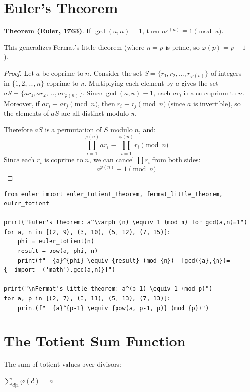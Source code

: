\section{Euler's Theorem}

\textbf{Theorem (Euler, 1763).} If $\gcd(a,n) = 1$, then $a^{\varphi(n)} \equiv 1 \pmod{n}$.

This generalizes Fermat's little theorem (where $n=p$ is prime, so $\varphi(p) = p-1$).

\begin{proof}
Let $a$ be coprime to $n$. Consider the set $S = \{r_1, r_2, \ldots, r_{\varphi(n)}\}$ of integers
in $\{1, 2, \ldots, n\}$ coprime to $n$. Multiplying each element by $a$ gives the set
$aS = \{ar_1, ar_2, \ldots, ar_{\varphi(n)}\}$. Since $\gcd(a,n) = 1$, each $ar_i$ is also coprime to $n$.
Moreover, if $ar_i \equiv ar_j \pmod{n}$, then $r_i \equiv r_j \pmod{n}$ (since $a$ is invertible),
so the elements of $aS$ are all distinct modulo $n$.

Therefore $aS$ is a permutation of $S$ modulo $n$, and:
\[
\prod_{i=1}^{\varphi(n)} ar_i \equiv \prod_{i=1}^{\varphi(n)} r_i \pmod{n}
\]
Since each $r_i$ is coprime to $n$, we can cancel $\prod r_i$ from both sides:
\[
a^{\varphi(n)} \equiv 1 \pmod{n}
\]
\end{proof}

\begin{lstlisting}[caption={Euler's theorem and Fermat's little theorem}, label=lst:euler_theorem]
from euler import euler_totient_theorem, fermat_little_theorem, euler_totient

print("Euler's theorem: a^\varphi(n) \equiv 1 (mod n) for gcd(a,n)=1")
for a, n in [(2, 9), (3, 10), (5, 12), (7, 15)]:
    phi = euler_totient(n)
    result = pow(a, phi, n)
    print(f"  {a}^{phi} \equiv {result} (mod {n})  [gcd({a},{n})={__import__('math').gcd(a,n)}]")

print("\nFermat's little theorem: a^(p-1) \equiv 1 (mod p)")
for a, p in [(2, 7), (3, 11), (5, 13), (7, 13)]:
    print(f"  {a}^{p-1} \equiv {pow(a, p-1, p)} (mod {p})")
\end{lstlisting}

\section{The Totient Sum Function}

The sum of totient values over divisors:

\begin{theorem}
$\sum_{d|n} \varphi(d) = n$
\end{theorem}

